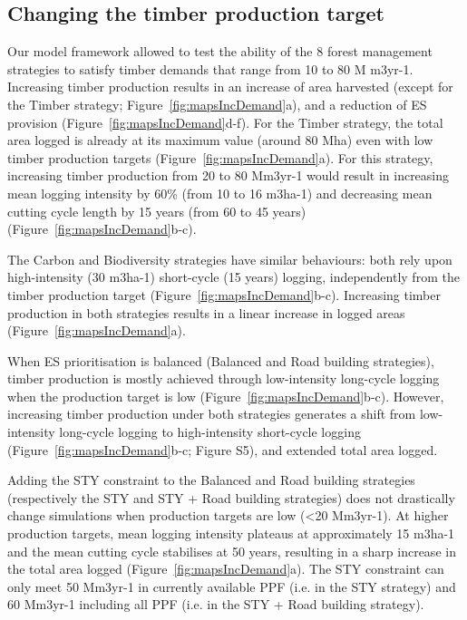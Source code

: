 \documentclass{article}
\begin{document}
\subsection{Changing the timber production target}

Our model framework allowed to test the ability of the 8 forest management strategies to satisfy timber demands that range from 10 to 80 M m3yr-1. Increasing timber production results in an increase of area harvested (except for the Timber strategy; Figure~\ref{fig:mapsIncDemand}a), and a reduction of ES provision (Figure~\ref{fig:mapsIncDemand}d-f). For the Timber strategy, the total area logged is already at its maximum value (around 80 Mha) even with low timber production targets (Figure~\ref{fig:mapsIncDemand}a). For this strategy, increasing timber production from 20 to 80 Mm3yr-1 would result in increasing mean logging intensity by 60\% (from 10 to 16 m3ha-1) and decreasing mean cutting cycle length by 15 years (from 60 to 45 years) (Figure~\ref{fig:mapsIncDemand}b-c).

The Carbon and Biodiversity strategies have similar behaviours: both rely upon high-intensity (30 m3ha-1) short-cycle (15 years) logging, independently from the timber production target (Figure~\ref{fig:mapsIncDemand}b-c). Increasing timber production in both strategies results in a linear increase in logged areas (Figure~\ref{fig:mapsIncDemand}a).

When ES prioritisation is balanced (Balanced and Road building strategies), timber production is mostly achieved through low-intensity long-cycle logging when the production target is low (Figure~\ref{fig:mapsIncDemand}b-c). However, increasing timber production under both strategies generates a shift from low-intensity long-cycle logging to high-intensity short-cycle logging (Figure~\ref{fig:mapsIncDemand}b-c; Figure S5), and extended total area logged.

Adding the STY constraint to the Balanced and Road building strategies (respectively the STY and STY + Road building strategies) does not drastically change simulations when production targets are low (<20 Mm3yr-1). At higher production targets, mean logging intensity plateaus at approximately 15 m3ha-1 and the mean cutting cycle stabilises at 50 years, resulting in a sharp increase in the total area logged (Figure~\ref{fig:mapsIncDemand}a).  The STY constraint can only meet 50 Mm3yr-1 in currently available PPF (i.e. in the STY strategy) and 60 Mm3yr-1 including all PPF (i.e. in the STY + Road building strategy).
\end{document}
